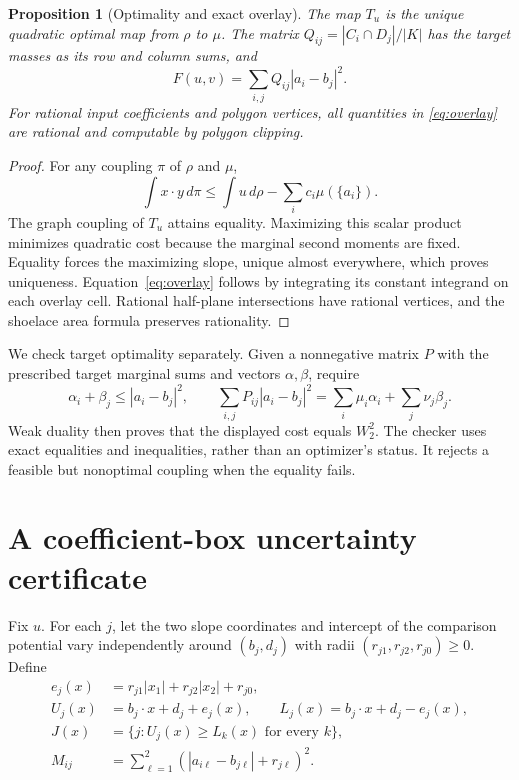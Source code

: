 \documentclass[11pt]{article}
\newtheorem{proposition}[theorem]{Proposition}
\theoremstyle{remark}
\begin{document}
\begin{proposition}[Optimality and exact overlay]\label{prop:overlay}
The map $T_u$ is the unique quadratic optimal map from $\rho$ to $\mu$.
The matrix $Q_{ij}=|C_i\cap D_j|/|K|$ has the target masses as its row and
column sums, and
\begin{equation}\label{eq:overlay}
 F(u,v)=\sum_{i,j}Q_{ij}|a_i-b_j|^2.
\end{equation}
For rational input coefficients and polygon vertices, all quantities in
\eqref{eq:overlay} are rational and computable by polygon clipping.
\end{proposition}
\begin{proof}
For any coupling $\pi$ of $\rho$ and $\mu$,
\[
 \int x\cdot y\,d\pi\leq\int u\,d\rho-\sum_i c_i\mu(\{a_i\}).
\]
The graph coupling of $T_u$ attains equality. Maximizing this scalar product
minimizes quadratic cost because the marginal second moments are fixed.
Equality forces the maximizing slope, unique almost everywhere, which proves
uniqueness. Equation~\eqref{eq:overlay} follows by integrating its constant
integrand on each overlay cell. Rational half-plane intersections have
rational vertices, and the shoelace area formula preserves rationality.
\end{proof}

We check target optimality separately. Given a nonnegative matrix $P$ with
the prescribed target marginal sums and vectors $\alpha,\beta$, require
\begin{equation}\label{eq:dual}
 \alpha_i+\beta_j\leq |a_i-b_j|^2,\qquad
 \sum_{i,j}P_{ij}|a_i-b_j|^2
 =\sum_i\mu_i\alpha_i+\sum_j\nu_j\beta_j.
\end{equation}
Weak duality then proves that the displayed cost equals $W_2^2$. The checker
uses exact equalities and inequalities, rather than an optimizer's status.
It rejects a feasible but nonoptimal coupling when the equality fails.

\section{A coefficient-box uncertainty certificate}\label{sec:box}
Fix $u$. For each $j$, let the two slope coordinates and intercept of the
comparison potential vary independently around $(b_j,d_j)$ with radii
$(r_{j1},r_{j2},r_{j0})\geq0$. Define
\begin{align*}
 e_j(x)&=r_{j1}|x_1|+r_{j2}|x_2|+r_{j0},\\
 U_j(x)&=b_j\cdot x+d_j+e_j(x),\qquad
 L_j(x)=b_j\cdot x+d_j-e_j(x),\\
 J(x)&=\{j:U_j(x)\geq L_k(x)\text{ for every }k\},\\
 M_{ij}&=\sum_{\ell=1}^2(|a_{i\ell}-b_{j\ell}|+r_{j\ell})^2.
\end{align*}
\end{document}

